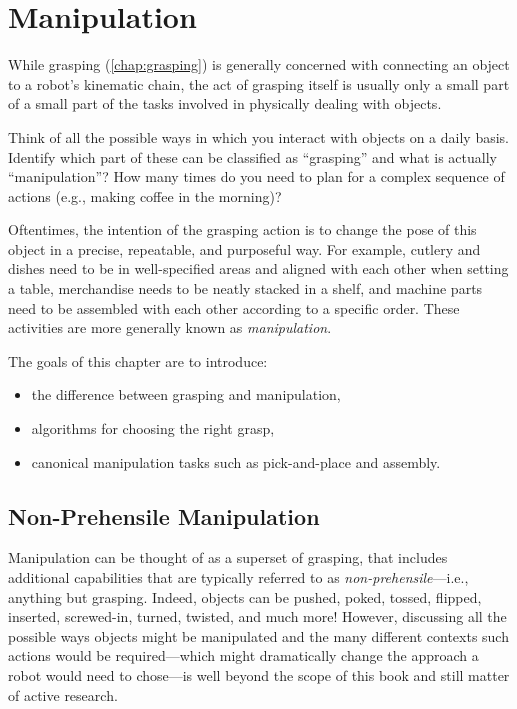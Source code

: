 \chapter{Manipulation}\label{chap:manipulation}

While grasping (\cref{chap:grasping}) is generally concerned with connecting an object to a robot's kinematic chain, the act of grasping itself is usually only a small part of a small part of the tasks involved in physically dealing with objects.


\begin{mdframed}
Think of all the possible ways in which you interact with objects on a daily basis. Identify which part of these can be classified as ``grasping'' and what is actually ``manipulation''? How many times do you need to plan for a complex sequence of actions (e.g., making coffee in the morning)?
\end{mdframed}

Oftentimes, the intention of the grasping action is to change the pose of this object in a precise, repeatable, and purposeful way.
For example, cutlery and dishes need to be in well-specified areas and aligned with each other when setting a table, merchandise needs to be neatly stacked in a shelf, and machine parts need to be assembled with each other according to a specific order.
These activities are more generally known as \textsl{manipulation}.


The goals of this chapter are to introduce:

\begin{itemize}
\item the difference between grasping and manipulation,
\item algorithms for choosing the right grasp, 
\item canonical manipulation tasks such as pick-and-place and assembly. 
\end{itemize}

\section{Non-Prehensile Manipulation}
Manipulation can be thought of as a superset of grasping, that includes additional capabilities that are typically referred to as \textsl{non-prehensile}---i.e., anything but grasping. Indeed, objects can be pushed, poked, tossed, flipped, inserted, screwed-in, turned, twisted, and much more!
However, discussing all the possible ways objects might be manipulated and the many different contexts such actions would be required---which might dramatically change the approach a robot would need to chose---is well beyond the scope of this book and still matter of active research.

